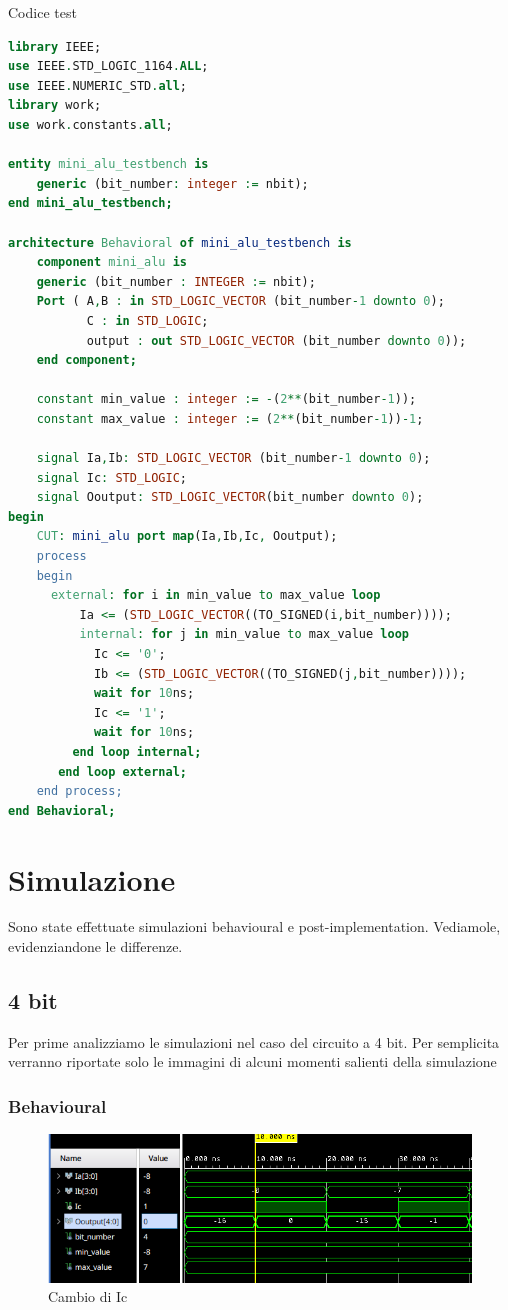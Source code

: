 \begin{problem}{Codice test}{}
\begin{lstlisting}[language=VHDL]
library IEEE;
use IEEE.STD_LOGIC_1164.ALL;
use IEEE.NUMERIC_STD.all;
library work;
use work.constants.all;

entity mini_alu_testbench is
    generic (bit_number: integer := nbit);
end mini_alu_testbench;

architecture Behavioral of mini_alu_testbench is
    component mini_alu is
    generic (bit_number : INTEGER := nbit);
    Port ( A,B : in STD_LOGIC_VECTOR (bit_number-1 downto 0);
           C : in STD_LOGIC;
           output : out STD_LOGIC_VECTOR (bit_number downto 0));
    end component;
    
    constant min_value : integer := -(2**(bit_number-1));
    constant max_value : integer := (2**(bit_number-1))-1;

    signal Ia,Ib: STD_LOGIC_VECTOR (bit_number-1 downto 0);
    signal Ic: STD_LOGIC;
    signal Ooutput: STD_LOGIC_VECTOR(bit_number downto 0);
begin 
    CUT: mini_alu port map(Ia,Ib,Ic, Ooutput);
    process 
    begin
      external: for i in min_value to max_value loop
          Ia <= (STD_LOGIC_VECTOR((TO_SIGNED(i,bit_number))));
          internal: for j in min_value to max_value loop
            Ic <= '0';
            Ib <= (STD_LOGIC_VECTOR((TO_SIGNED(j,bit_number))));
            wait for 10ns;
            Ic <= '1';
            wait for 10ns;
         end loop internal;
       end loop external;   
    end process;
end Behavioral;
\end{lstlisting}
\end{problem}

\clearpage
\section{Simulazione}
Sono state effettuate simulazioni behavioural e post-implementation. Vediamole, evidenziandone le differenze.

\subsection{4 bit}
Per prime analizziamo le simulazioni nel caso del circuito a 4 bit.
Per semplicita verranno riportate solo le immagini di alcuni momenti salienti della simulazione
\subsubsection{Behavioural}
\begin{figure}[ht]
      \centering
      \includegraphics[width=1\textwidth]{assets/simulations/behavioural/4bit/4bit_behav.png}
      \caption{Cambio di Ic}
      \label{4bit_behav}
\end{figure}

